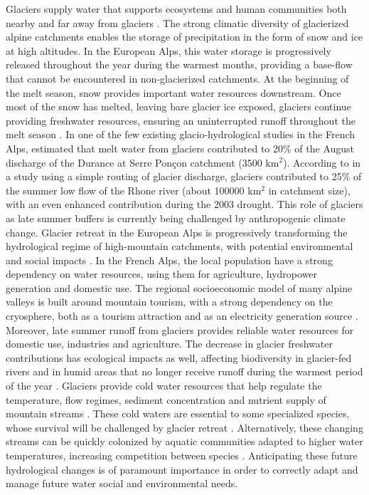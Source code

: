 Glaciers supply water that supports ecosystems and human communities both nearby and far away from glaciers \citep{ipcc_climate_2018}. The strong climatic diversity of glacierized alpine catchments enables the storage of precipitation in the form of snow and ice at high altitudes. In the European Alps, this water storage is progressively released throughout the year during the warmest months, providing a base-flow that cannot be encountered in non-glacierized catchments. At the beginning of the melt season, snow provides important water resources downstream. Once most of the snow has melted, leaving bare glacier ice exposed, glaciers continue providing freshwater resources, ensuring an uninterrupted runoff throughout the melt season \citep{huss_toward_2017}. In one of the few existing glacio-hydrological studies in the French Alps, \citet{lafaysse_influence_2011} estimated that melt water from glaciers contributed to 20\% of the August discharge of the Durance at Serre Ponçon catchment (3500 km$^{2}$). According to \citet{huss_present_2011} in a study using a simple routing of glacier discharge, glaciers contributed to 25\% of the summer low flow of the Rhone river (about 100000 km$^{2}$ in catchment size), with an even enhanced contribution during the 2003 drought. This role of glaciers as late summer buffers is currently being challenged by anthropogenic climate change. Glacier retreat in the European Alps is progressively transforming the hydrological regime of high-mountain catchments, with potential environmental and social impacts \citep{zekollari_modelling_2019}. In the French Alps, the local population have a strong dependency on water resources, using them for agriculture, hydropower generation and domestic use. The regional socioeconomic model of many alpine valleys is built around mountain tourism, with a strong dependency on the cryosphere, both as a tourism attraction \citep{schut_sport_2013, spandre_winter_2019} and as an electricity generation source \citep{schaefli_role_2019}. Moreover, late summer runoff from glaciers provides reliable water resources for domestic use, industries and agriculture. The decrease in glacier freshwater contributions has ecological impacts as well, affecting biodiversity in glacier-fed rivers \citep{cauvy-fraunie_global_2019} and in humid areas that no longer receive runoff during the warmest period of the year \citep{carlson_monitoring_2020}. Glaciers provide cold water resources that help regulate the temperature, flow regimes, sediment concentration and nutrient supply of mountain streams \citep{huss_toward_2017}. These cold waters are essential to some specialized species, whose survival will be challenged by glacier retreat \citep{lencioni_glacial_2018, cauvy-fraunie_global_2019}. Alternatively, these changing streams can be quickly colonized by aquatic communities adapted to higher water temperatures, increasing competition between species  \citep{robinson_ecosystem_2014}. Anticipating these future hydrological changes is of paramount importance in order to correctly adapt and manage future water social and environmental needs. 


